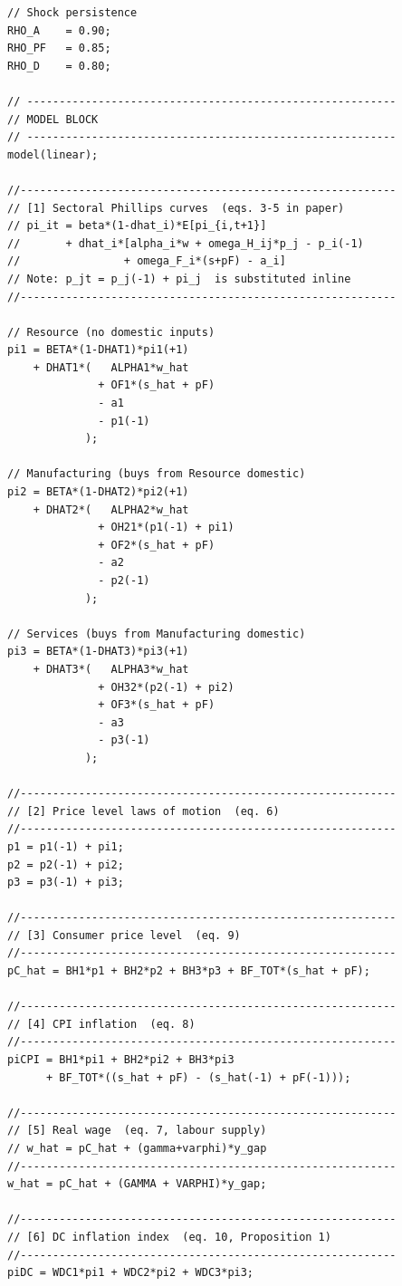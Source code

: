 \documentclass[11pt,a4paper]{article}
\begin{document}
\begin{lstlisting}[caption={Superseded: original hand-linearized draft},label={lst:dynare-old}]
// Shock persistence
RHO_A    = 0.90;
RHO_PF   = 0.85;
RHO_D    = 0.80;

// ---------------------------------------------------------
// MODEL BLOCK
// ---------------------------------------------------------
model(linear);

//----------------------------------------------------------
// [1] Sectoral Phillips curves  (eqs. 3-5 in paper)
// pi_it = beta*(1-dhat_i)*E[pi_{i,t+1}]
//       + dhat_i*[alpha_i*w + omega_H_ij*p_j - p_i(-1)
//                + omega_F_i*(s+pF) - a_i]
// Note: p_jt = p_j(-1) + pi_j  is substituted inline
//----------------------------------------------------------

// Resource (no domestic inputs)
pi1 = BETA*(1-DHAT1)*pi1(+1)
    + DHAT1*(   ALPHA1*w_hat
              + OF1*(s_hat + pF)
              - a1
              - p1(-1)
            );

// Manufacturing (buys from Resource domestic)
pi2 = BETA*(1-DHAT2)*pi2(+1)
    + DHAT2*(   ALPHA2*w_hat
              + OH21*(p1(-1) + pi1)
              + OF2*(s_hat + pF)
              - a2
              - p2(-1)
            );

// Services (buys from Manufacturing domestic)
pi3 = BETA*(1-DHAT3)*pi3(+1)
    + DHAT3*(   ALPHA3*w_hat
              + OH32*(p2(-1) + pi2)
              + OF3*(s_hat + pF)
              - a3
              - p3(-1)
            );

//----------------------------------------------------------
// [2] Price level laws of motion  (eq. 6)
//----------------------------------------------------------
p1 = p1(-1) + pi1;
p2 = p2(-1) + pi2;
p3 = p3(-1) + pi3;

//----------------------------------------------------------
// [3] Consumer price level  (eq. 9)
//----------------------------------------------------------
pC_hat = BH1*p1 + BH2*p2 + BH3*p3 + BF_TOT*(s_hat + pF);

//----------------------------------------------------------
// [4] CPI inflation  (eq. 8)
//----------------------------------------------------------
piCPI = BH1*pi1 + BH2*pi2 + BH3*pi3
      + BF_TOT*((s_hat + pF) - (s_hat(-1) + pF(-1)));

//----------------------------------------------------------
// [5] Real wage  (eq. 7, labour supply)
// w_hat = pC_hat + (gamma+varphi)*y_gap
//----------------------------------------------------------
w_hat = pC_hat + (GAMMA + VARPHI)*y_gap;

//----------------------------------------------------------
// [6] DC inflation index  (eq. 10, Proposition 1)
//----------------------------------------------------------
piDC = WDC1*pi1 + WDC2*pi2 + WDC3*pi3;


\end{lstlisting}
\end{document}
